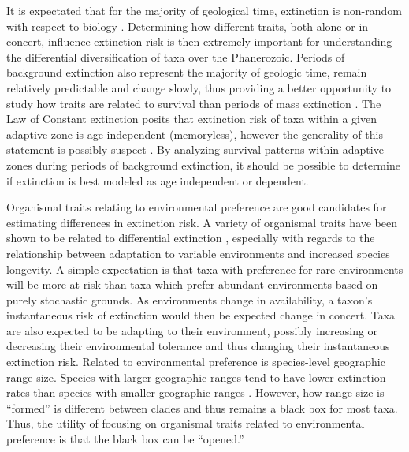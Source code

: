 \documentclass[12pt,letterpaper]{article}
\begin{document}
It is expectated that for the majority of geological time, extinction is non-random with respect to biology \citep{Jablonski1986}. Determining how different traits, both alone or in concert, influence extinction risk is then extremely important for understanding the differential diversification of taxa over the Phanerozoic. Periods of background extinction also represent the majority of geologic time, remain relatively predictable and change slowly, thus providing a better opportunity to study how traits are related to survival than periods of mass extinction \citep{Jablonski1986,Raup1988}. The Law of Constant extinction \citep{VanValen1973} posits that extinction risk of taxa within a given adaptive zone is age independent (memoryless), however the generality of this statement is possibly suspect \citep{Drake2014,Raup1975,Sepkoski1975,Finnegan2008}. By analyzing survival patterns within adaptive zones during periods of background extinction, it should be possible to determine if extinction is best modeled as age independent or dependent.

Organismal traits relating to environmental preference are good candidates for estimating differences in extinction risk. A variety of organismal traits have been shown to be related to differential extinction \citep{Foote2013,Liow2007b,Baumiller1993,Nurnberg2013a}, especially with regards to the relationship between adaptation to variable environments and increased species longevity. A simple expectation is that taxa with preference for rare environments will be more at risk than taxa which prefer abundant environments based on purely stochastic grounds. As environments change in availability, a taxon's instantaneous risk of extinction would then be expected change in concert. Taxa are also expected to be adapting to their environment, possibly increasing or decreasing their environmental tolerance and thus changing their instantaneous extinction risk. Related to environmental preference is species-level geographic range size. Species with larger geographic ranges tend to have lower extinction rates than species with smaller geographic ranges \citep{Jablonski1986,Harnik2013,Nurnberg2013a,Jablonski2003,Roy2009c}. However, how range size is ``formed'' is different between clades \citep{Jablonski1987} and thus remains a black box for most taxa. Thus, the utility of focusing on organismal traits related to environmental preference is that the black box can be ``opened.''
\end{document}
